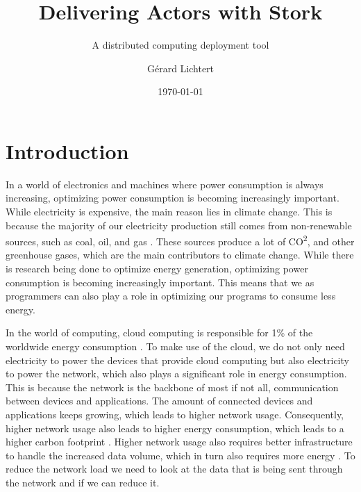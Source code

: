\documentclass[a4paper]{article}
\title{Delivering Actors with Stork}
\subtitle{ A distributed computing deployment tool}
\author{Gérard Lichtert}
\date{\today}
\begin{document}
\maketitle
\tableofcontents
\newpage
\raggedright{}


\section{Introduction}
In a world of electronics and machines where power consumption is always increasing, optimizing power consumption is becoming increasingly important. While electricity is expensive, the main reason lies in climate change. This is because the majority of our electricity production still comes from non-renewable sources, such as coal, oil, and gas \cite{owid-energy-mix}. These sources produce a lot of CO\textsuperscript{2}, and other greenhouse gases, which are the main contributors to climate change. While there is research being done to optimize energy generation, optimizing power consumption is becoming increasingly important. This means that we as programmers can also play a role in optimizing our programs to consume less energy.

In the world of computing, cloud computing is responsible for 1\% of the worldwide energy consumption \cite{cloudcomputingenergycrisis}. To make use of the cloud, we do not only need electricity to power the devices that provide cloud computing but also electricity to power the network, which also plays a significant role in energy consumption. This is because the network is the backbone of most if not all, communication between devices and applications. The amount of connected devices and applications keeps growing, which leads to higher network usage. Consequently, higher network usage also leads to higher energy consumption, which leads to a higher carbon footprint \cite{RATHEESH}. Higher network usage also requires better infrastructure to handle the increased data volume, which in turn also requires more energy \cite{datavolumeeffects}. To reduce the network load we need to look at the data that is being sent through the network and if we can reduce it.
\end{document}
